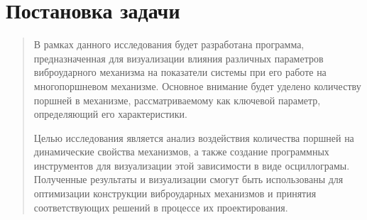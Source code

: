 \section{Постановка задачи}

\begin{quotation}
В рамках данного исследования будет разработана программа, предназначенная для визуализации влияния различных параметров виброударного механизма на показатели системы при его работе на многопоршневом механизме. Основное внимание будет уделено количеству поршней в механизме, рассматриваемому как ключевой параметр, определяющий его характеристики. 

Целью исследования является анализ воздействия количества поршней на динамические свойства механизмов, а также создание программных инструментов для визуализации этой зависимости в виде осциллограмы. Полученные результаты и визуализации смогут быть использованы для оптимизации конструкции виброударных механизмов и принятия соответствующих решений в процессе их проектирования.
\end{quotation}